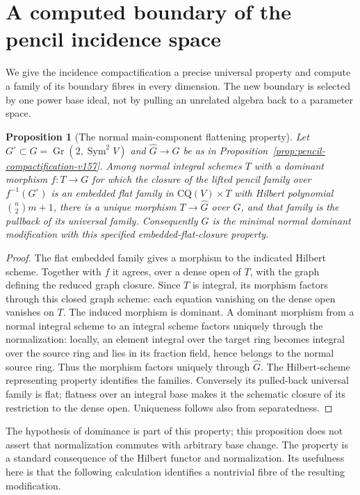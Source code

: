 \documentclass[11pt,reqno]{amsart}
\numberwithin{equation}{section}
\newtheorem{proposition}[theorem]{Proposition}
\theoremstyle{definition}\newtheorem{definition}[theorem]{Definition}
\theoremstyle{remark}\newtheorem{remark}[theorem]{Remark}
\DeclareMathOperator{\Sym}{Sym}\DeclareMathOperator{\Gr}{Gr}
\begin{document}
\section{A computed boundary of the pencil incidence space}
\label{sec:computed-boundary-v158}
We give the incidence compactification a precise universal property and
compute a family of its boundary fibres in every dimension. The new
boundary is selected by one power base ideal, not by pulling an
unrelated algebra back to a parameter space.

\begin{proposition}[The normal main-component flattening property]
\label{prop:flattening-property-v158}
Let $G^\circ\subset G=\Gr(2,\Sym^2V)$ and
$\widehat G\to G$ be as in Proposition~\ref{prop:pencil-compactification-v157}.
Among normal integral schemes $T$ with a dominant morphism $f:T\to G$
for which the closure of the lifted pencil family over $f^{-1}(G^\circ)$
is an embedded flat family in $\mathrm{CQ}(V)\times T$ with Hilbert
polynomial $\binom n2 m+1$, there is a unique morphism $T\to\widehat G$
over $G$, and that family is the pullback of its universal family.
Consequently $\widehat G$ is the minimal normal dominant modification
with this specified embedded-flat-closure property.
\end{proposition}
\begin{proof}
The flat embedded family gives a morphism to the indicated Hilbert
scheme. Together with $f$ it agrees, over a dense open of $T$, with
the graph defining the reduced graph closure. Since $T$ is integral,
its morphism factors through this closed graph scheme: each equation
vanishing on the dense open vanishes on $T$. The induced morphism is
dominant. A dominant morphism from a normal integral scheme to an
integral scheme factors uniquely through the normalization: locally,
an element integral over the target ring becomes integral over the
source ring and lies in its fraction field, hence belongs to the
normal source ring. Thus the morphism factors uniquely through
$\widehat G$. The Hilbert-scheme representing property identifies
the families. Conversely its pulled-back universal family is flat;
flatness over an integral base makes it the schematic closure of its
restriction to the dense open. Uniqueness follows also from separatedness.
\end{proof}

The hypothesis of dominance is part of this property; this proposition
does not assert that normalization commutes with arbitrary base change.
The property is a standard consequence of the Hilbert functor and
normalization. Its usefulness here is that the following calculation
identifies a nontrivial fibre of the resulting modification.
\end{document}
